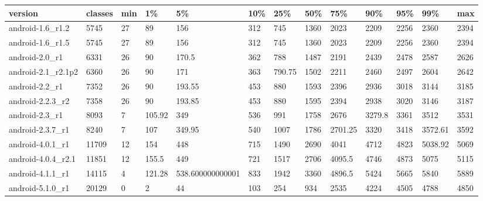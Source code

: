 \begin{tabular}{|l|l|l|l|l|l|l|l|l|l|l|l|l|}
\hline
version&classes&min&1\%&5\%&10\%&25\%&50\%&75\%&90\%&95\%&99\%&max\\
\hline
android-1.6\_r1.2&5745&27&89&156&312&745&1360&2023&2209&2256&2360&2394\\
\hline
android-1.6\_r1.5&5745&27&89&156&312&745&1360&2023&2209&2256&2360&2394\\
\hline
android-2.0\_r1&6331&26&90&170.5&362&788&1487&2191&2439&2478&2587&2626\\
\hline
android-2.1\_r2.1p2&6360&26&90&171&363&790.75&1502&2211&2460&2497&2604&2642\\
\hline
android-2.2\_r1&7352&26&90&193.55&453&880&1593&2396&2936&3018&3144&3185\\
\hline
android-2.2.3\_r2&7358&26&90&193.85&453&880&1595&2394&2938&3020&3146&3187\\
\hline
android-2.3\_r1&8093&7&105.92&349&536&991&1758&2676&3279.8&3361&3512&3531\\
\hline
android-2.3.7\_r1&8240&7&107&349.95&540&1007&1786&2701.25&3320&3418&3572.61&3592\\
\hline
android-4.0.1\_r1&11709&12&154&448&715&1490&2690&4041&4712&4823&5038.92&5069\\
\hline
android-4.0.4\_r2.1&11851&12&155.5&449&721&1517&2706&4095.5&4746&4873&5075&5115\\
\hline
android-4.1.1\_r1&14115&4&121.28&538.600000000001&833&1942&3360&4896.5&5424&5665&5840&5889\\
\hline
android-5.1.0\_r1&20129&0&2&44&103&254&934&2535&4224&4505&4788&4850\\
\hline
\end{tabular}
